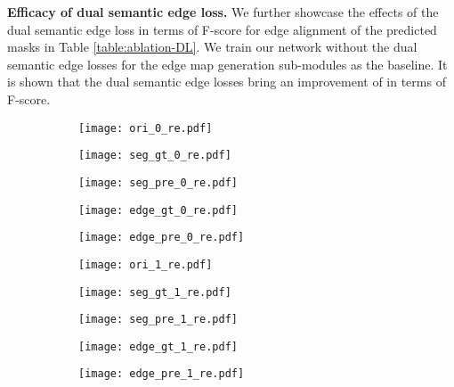 \documentclass[runningheads]{llncs}
\begin{document}
\smallskip \noindent \textbf{Efficacy of dual semantic edge loss.}
We further showcase the effect{s} of the dual semantic edge loss in terms of F-score for edge alignment of the predicted {\SemSegPoint} masks in Table \ref{table:ablation-DL}. We train our network {without} 
the dual semantic edge losses {for}
the edge map generation sub-modules as the baseline. It is shown that the dual semantic edge losses bring an improvement of {} in terms of F-score.



\begin{figure}
\captionsetup[subfigure]{labelformat=empty}
\begin{subfigure}{.193\textwidth}
  \centering
  \texttt{[image: ori\_0\_re.pdf]}
\end{subfigure} \hfil
\begin{subfigure}{.193\textwidth}
  \centering
  \texttt{[image: seg\_gt\_0\_re.pdf]}
\end{subfigure} \hfil
\begin{subfigure}{.193\textwidth}
  \centering
  \texttt{[image: seg\_pre\_0\_re.pdf]}
\end{subfigure} \hfil
\begin{subfigure}{.193\textwidth}
  \centering
  \texttt{[image: edge\_gt\_0\_re.pdf]}
\end{subfigure} \hfil
\begin{subfigure}{.193\textwidth}
  \centering
  \texttt{[image: edge\_pre\_0\_re.pdf]}
\end{subfigure}

\begin{subfigure}{.193\textwidth}
  \centering
  \texttt{[image: ori\_1\_re.pdf]}
\end{subfigure} \hfil
\begin{subfigure}{.193\textwidth}
  \centering
  \texttt{[image: seg\_gt\_1\_re.pdf]}
\end{subfigure} \hfil
\begin{subfigure}{.193\textwidth}
  \centering
  \texttt{[image: seg\_pre\_1\_re.pdf]}
\end{subfigure} \hfil
\begin{subfigure}{.193\textwidth}
  \centering
  \texttt{[image: edge\_gt\_1\_re.pdf]}
\end{subfigure} \hfil
\begin{subfigure}{.193\textwidth}
  \centering
  \texttt{[image: edge\_pre\_1\_re.pdf]}
\end{subfigure}


\end{figure}
\end{document}
